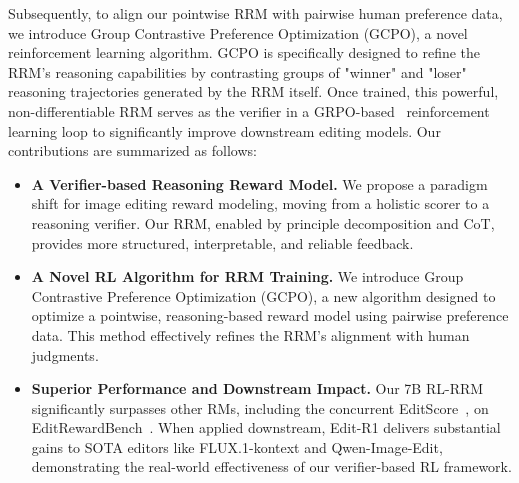Subsequently, to align our pointwise RRM with pairwise human preference data, we introduce Group Contrastive Preference Optimization (GCPO), a novel reinforcement learning algorithm. 
GCPO is specifically designed to refine the RRM's reasoning capabilities by contrasting groups of "winner" and "loser" reasoning trajectories generated by the RRM itself. Once trained, this powerful, non-differentiable RRM serves as the verifier in a GRPO-based~\citep{xue2025dancegrpo, liu2025flow} reinforcement learning loop to significantly improve downstream editing models. Our contributions are summarized as follows:

\begin{itemize}[leftmargin=*]
    \item \textbf{A Verifier-based Reasoning Reward Model.} We propose a paradigm shift for image editing reward modeling, moving from a holistic scorer to a reasoning verifier. Our RRM, enabled by principle decomposition and CoT, provides more structured, interpretable, and reliable feedback.
    
    \item \textbf{A Novel RL Algorithm for RRM Training.} We introduce Group Contrastive Preference Optimization (GCPO), a new algorithm designed to optimize a pointwise, reasoning-based reward model using pairwise preference data. This method effectively refines the RRM's alignment with human judgments.
    
    \item \textbf{Superior Performance and Downstream Impact.} Our 7B RL-RRM significantly surpasses other RMs, including the concurrent EditScore~\citep{luo2025editscore}, on EditRewardBench~\citep{luo2025editscore}. When applied downstream, Edit-R1 delivers substantial gains to SOTA editors like FLUX.1-kontext and Qwen-Image-Edit, demonstrating the real-world effectiveness of our verifier-based RL framework.
\end{itemize}


